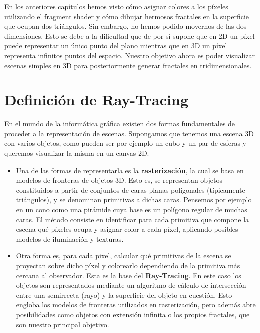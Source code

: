 %
%

En los anteriores capítulos hemos visto cómo asignar colores a los píxeles utilizando el fragment shader y cómo dibujar hermosos fractales en la superficie que ocupan dos triángulos. Sin embargo, no hemos podido movernos de las dos dimensiones. Esto se debe a la dificultad que de por sí supone que en 2D un píxel puede representar un único punto del plano mientras que en 3D un píxel representa infinitos puntos del espacio. Nuestro objetivo ahora es poder visualizar escenas simples en 3D para posteriormente generar fractales en tridimensionales.

\section{Definición de Ray-Tracing}

En el mundo de la informática gráfica existen dos formas fundamentales de proceder a la representación de escenas. Supongamos que tenemos una escena 3D con varios objetos, como pueden ser por ejemplo un cubo y un par de esferas y queremos visualizar la misma en un canvas 2D.
\begin{itemize}
    \item Una de las formas de representarla es la \textbf{rasterización}, la cual se basa en modelos de fronteras de objetos 3D. Esto es, se representan objetos constituidos a partir de conjuntos de caras planas poligonales (típicamente triángulos), y se denominan primitivas a dichas caras. Pensemos por ejemplo en un cono como una pirámide cuya base es un polígono regular de muchas caras. El método consiste en identificar para cada primitiva que compone la escena qué píxeles ocupa y asignar color a cada píxel, aplicando posibles modelos de iluminación y texturas.
    \item Otra forma es, para cada pixel, calcular qué primitivas de la escena se proyectan sobre dicho píxel y colorearlo dependiendo de la primitiva más cercana al observador. Esta es la base del \textbf{Ray-Tracing}. En este caso los objetos son representados mediante un algoritmo de cálculo de intersección entre una semirrecta (rayo) y la superficie del objeto en cuestión. Esto engloba los modelos de fronteras utilizados en rasterización, pero además abre posibilidades como objetos con extensión infinita o los propios fractales, que son nuestro principal objetivo.
\end{itemize}

